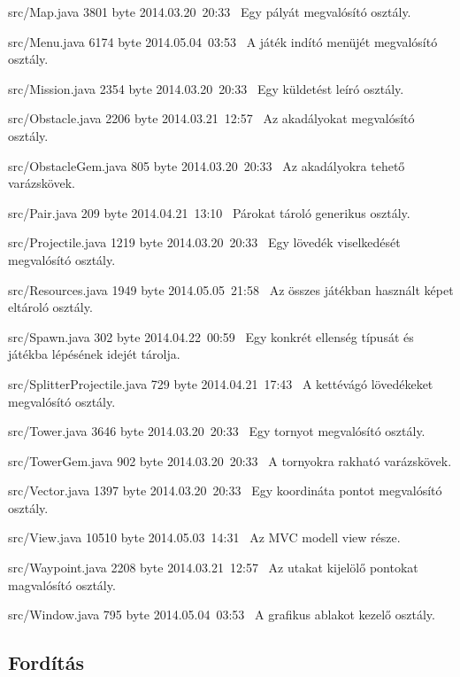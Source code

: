 \begin{fajllista}
\fajl
{src/Map.java}
{3801 byte}
{2014.03.20~20:33~}
{Egy pályát megvalósító osztály.}

\fajl
{src/Menu.java}
{6174 byte}
{2014.05.04~03:53~}
{A játék indító menüjét megvalósító osztály.}

\fajl
{src/Mission.java}
{2354 byte}
{2014.03.20~20:33~}
{Egy küldetést leíró osztály.}

\fajl
{src/Obstacle.java}
{2206 byte}
{2014.03.21~12:57~}
{Az akadályokat megvalósító osztály.}

\fajl
{src/ObstacleGem.java}
{805 byte}
{2014.03.20~20:33~}
{Az akadályokra tehető varázskövek.}

\fajl
{src/Pair.java}
{209 byte}
{2014.04.21~13:10~}
{Párokat tároló generikus osztály.}

\fajl
{src/Projectile.java}
{1219 byte}
{2014.03.20~20:33~}
{Egy lövedék viselkedését megvalósító osztály.}

\fajl
{src/Resources.java}
{1949 byte}
{2014.05.05~21:58~}
{Az összes játékban használt képet eltároló osztály.}

\fajl
{src/Spawn.java}
{302 byte}
{2014.04.22~00:59~}
{Egy konkrét ellenség típusát és játékba lépésének idejét tárolja.}

\fajl
{src/SplitterProjectile.java}
{729 byte}
{2014.04.21~17:43~}
{A kettévágó lövedékeket megvalósító osztály.}

\fajl
{src/Tower.java}
{3646 byte}
{2014.03.20~20:33~}
{Egy tornyot megvalósító osztály.}

\fajl
{src/TowerGem.java}
{902 byte}
{2014.03.20~20:33~}
{A tornyokra rakható varázskövek.}

\fajl
{src/Vector.java}
{1397 byte}
{2014.03.20~20:33~}
{Egy koordináta pontot megvalósító osztály.}

\fajl
{src/View.java}
{10510 byte}
{2014.05.03~14:31~}
{Az MVC modell view része.}

\fajl
{src/Waypoint.java}
{2208 byte}
{2014.03.21~12:57~}
{Az utakat kijelölő pontokat magvalósító osztály.}

\fajl
{src/Window.java}
{795 byte}
{2014.05.04~03:53~}
{A grafikus ablakot kezelő osztály.}

\end{fajllista}

\subsection{Fordítás}

